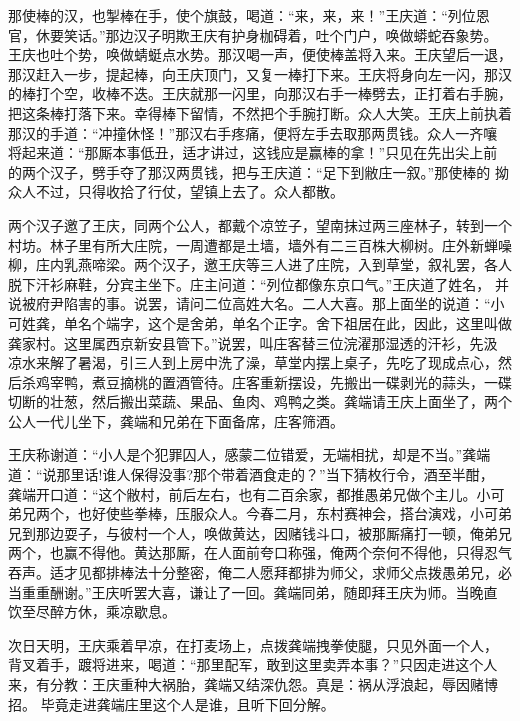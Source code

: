 那使棒的汉，也掣棒在手，使个旗鼓，喝道：“来，来，来！”王庆道：“列位恩
官，休要笑话。”那边汉子明欺王庆有护身枷碍着，吐个门户，唤做蟒蛇吞象势。
王庆也吐个势，唤做蜻蜓点水势。那汉喝一声，便使棒盖将入来。王庆望后一退，
那汉赶入一步，提起棒，向王庆顶门，又复一棒打下来。王庆将身向左一闪，那汉
的棒打个空，收棒不迭。王庆就那一闪里，向那汉右手一棒劈去，正打着右手腕，
把这条棒打落下来。幸得棒下留情，不然把个手腕打断。众人大笑。王庆上前执着
那汉的手道：“冲撞休怪！”那汉右手疼痛，便将左手去取那两贯钱。众人一齐嚷
将起来道：“那厮本事低丑，适才讲过，这钱应是赢棒的拿！”只见在先出尖上前
的两个汉子，劈手夺了那汉两贯钱，把与王庆道：“足下到敝庄一叙。”那使棒的
拗众人不过，只得收拾了行仗，望镇上去了。众人都散。

两个汉子邀了王庆，同两个公人，都戴个凉笠子，望南抹过两三座林子，转到一个
村坊。林子里有所大庄院，一周遭都是土墙，墙外有二三百株大柳树。庄外新蝉噪
柳，庄内乳燕啼梁。两个汉子，邀王庆等三人进了庄院，入到草堂，叙礼罢，各人
脱下汗衫麻鞋，分宾主坐下。庄主问道：“列位都像东京口气。”王庆道了姓名，
并说被府尹陷害的事。说罢，请问二位高姓大名。二人大喜。那上面坐的说道：“小
可姓龚，单名个端字，这个是舍弟，单名个正字。舍下祖居在此，因此，这里叫做
龚家村。这里属西京新安县管下。”说罢，叫庄客替三位浣濯那湿透的汗衫，先汲
凉水来解了暑渴，引三人到上房中洗了澡，草堂内摆上桌子，先吃了现成点心，然
后杀鸡宰鸭，煮豆摘桃的置酒管待。庄客重新摆设，先搬出一碟剥光的蒜头，一碟
切断的壮葱，然后搬出菜蔬、果品、鱼肉、鸡鸭之类。龚端请王庆上面坐了，两个
公人一代儿坐下，龚端和兄弟在下面备席，庄客筛酒。

王庆称谢道：“小人是个犯罪囚人，感蒙二位错爱，无端相扰，却是不当。”龚端
道：“说那里话!谁人保得没事?那个带着酒食走的？”当下猜枚行令，酒至半酣，
龚端开口道：“这个敝村，前后左右，也有二百余家，都推愚弟兄做个主儿。小可
弟兄两个，也好使些拳棒，压服众人。今春二月，东村赛神会，搭台演戏，小可弟
兄到那边耍子，与彼村一个人，唤做黄达，因赌钱斗口，被那厮痛打一顿，俺弟兄
两个，也赢不得他。黄达那厮，在人面前夸口称强，俺两个奈何不得他，只得忍气
吞声。适才见都排棒法十分整密，俺二人愿拜都排为师父，求师父点拨愚弟兄，必
当重重酬谢。”王庆听罢大喜，谦让了一回。龚端同弟，随即拜王庆为师。当晚直
饮至尽醉方休，乘凉歇息。

次日天明，王庆乘着早凉，在打麦场上，点拨龚端拽拳使腿，只见外面一个人，
背叉着手，踱将进来，喝道：“那里配军，敢到这里卖弄本事？”只因走进这个人
来，有分教：王庆重种大祸胎，龚端又结深仇怨。真是：祸从浮浪起，辱因赌博招。
毕竟走进龚端庄里这个人是谁，且听下回分解。